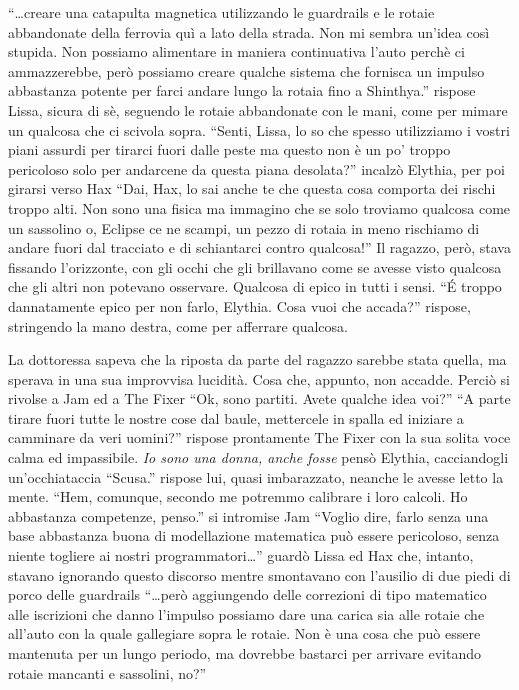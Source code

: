     ``\dots{}creare una catapulta magnetica utilizzando le guardrails e le
    rotaie abbandonate della ferrovia quì a lato della strada. Non mi
    sembra un'idea così stupida. Non possiamo alimentare in maniera
    continuativa l'auto perchè ci ammazzerebbe, però possiamo creare
    qualche sistema che fornisca un impulso abbastanza potente per farci
    andare lungo la rotaia fino a Shinthya.'' rispose Lissa, sicura di sè,
    seguendo le rotaie abbandonate con le mani, come per mimare un qualcosa
    che ci scivola sopra. ``Senti, Lissa, lo so che spesso utilizziamo i
    vostri piani assurdi per tirarci fuori dalle peste ma questo non è un
    po' troppo pericoloso solo per andarcene da questa piana desolata?''
    incalzò Elythia, per poi girarsi verso Hax ``Dai, Hax, lo sai anche te
    che questa cosa comporta dei rischi troppo alti. Non sono una fisica ma
    immagino che se solo troviamo qualcosa come un sassolino o, Eclipse ce
    ne scampi, un pezzo di rotaia in meno rischiamo di andare fuori dal
    tracciato e di schiantarci contro qualcosa!'' Il ragazzo, però,
    stava fissando l'orizzonte, con gli occhi che gli brillavano come se
    avesse visto qualcosa che gli altri non potevano osservare. Qualcosa di
    epico in tutti i sensi. ``\'E troppo dannatamente epico per non farlo,
    Elythia. Cosa vuoi che accada?'' rispose, stringendo la mano destra,
    come per afferrare qualcosa.

    La dottoressa sapeva che la riposta da parte del ragazzo sarebbe stata
    quella, ma sperava in una sua improvvisa lucidità. Cosa che, appunto,
    non accadde. Perciò si rivolse a Jam ed a The Fixer ``Ok, sono partiti.
    Avete qualche idea voi?'' ``A parte tirare fuori tutte le nostre cose
    dal baule, mettercele in spalla ed iniziare a camminare da veri
    uomini?'' rispose prontamente The Fixer con la sua solita voce calma ed
    impassibile. \emph{Io sono una donna, anche fosse} pensò Elythia,
    cacciandogli un'occhiataccia ``Scusa.'' rispose lui, quasi imbarazzato,
    neanche le avesse letto la mente. ``Hem, comunque, secondo me potremmo
    calibrare i loro calcoli. Ho abbastanza competenze, penso.'' si
    intromise Jam ``Voglio dire, farlo senza una base abbastanza buona di
    modellazione matematica può essere pericoloso, senza niente togliere ai
    nostri programmatori\dots{}'' guardò Lissa ed Hax che, intanto, stavano
    ignorando questo discorso mentre smontavano con l'ausilio di due piedi
    di porco delle guardrails ``\dots{}però aggiungendo delle correzioni di
    tipo matematico alle iscrizioni che danno l'impulso possiamo dare una
    carica sia alle rotaie che all'auto con la quale gallegiare sopra le
    rotaie. Non è una cosa che può essere mantenuta per un lungo periodo,
    ma dovrebbe bastarci per arrivare evitando rotaie mancanti e sassolini,
    no?''

